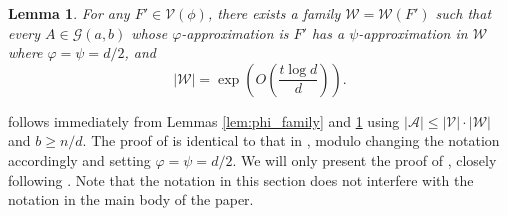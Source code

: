 \documentclass[reqno,a4paper,11pt]{amsart}
\newtheorem{lemma}[theorem]{Lemma}
\newcommand{\cA}{\mathcal{A}}
\newcommand{\cG}{\mathcal{G}}
\newcommand{\cV}{\mathcal{V}}
\newcommand{\cW}{\mathcal{W}}
\begin{document}
\begin{lemma}\label{lem:psi_family}
    For any $F'\in\cV(\phi)$, there exists a family $\cW=\cW(F')$ such that every $A\in\cG(a,b)$ whose $\varphi$-approximation is $F'$ has a $\psi$-approximation in $\cW$ where $\varphi=\psi=d/2$, and
    \begin{equation*}
        |\cW|=\exp\left(O\left(\frac{t\log d}{d}\right)\right).
    \end{equation*}
\end{lemma}

 follows immediately from Lemmas \ref{lem:phi_family} and \ref{lem:psi_family} using $|\cA|\leq|\cV|\cdot|\cW|$ and $b\geq n/d$. The proof of  is identical to that in \cite{galvin2019independent}, modulo changing the notation accordingly and setting $\varphi=\psi=d/2$.
We will only present the proof of , closely following \cite[Section 5.3]{galvin2019independent}. Note that the notation in this section does not interfere with the notation in the main body of the paper.
\end{document}
